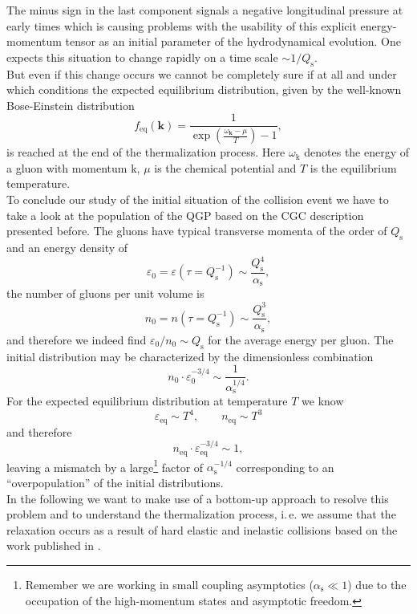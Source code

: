 The minus sign in the last component signals a negative longitudinal pressure at early times which is causing problems with the usability of this explicit energy-momentum tensor as an initial parameter of the hydrodynamical evolution. One expects this situation to change rapidly on a time scale $\sim 1/Q_{\mathrm{s}}$.\\
But even if this change occurs we cannot be completely sure if at all and under which conditions the expected equilibrium distribution, given by the well-known Bose-Einstein distribution 
\begin{equation}
	f_{\mathrm{eq}}(\mathbf{k}) = \frac{1}{\exp(\frac{\omega_{\mathbf{k}}-\mu}{T}) - 1}, \label{eqn:BEdist}
\end{equation}
is reached at the end of the thermalization process. Here $\omega_{\mathrm{k}}$ denotes the energy of a gluon with momentum $\mathrm{k}$, $\mu$ is the chemical potential and $T$ is the equilibrium temperature. \\

\noindent
To conclude our study of the initial situation of the collision event we have to take a look at the population of the QGP based on the CGC description presented before. The gluons have typical transverse momenta of the order of $Q_{\mathrm{s}}$ and an energy density of 
\begin{equation}
	\varepsilon_0 = \varepsilon(\tau=Q_{\mathrm{s}}^{-1})\sim \frac{Q_{\mathrm{s}}^{4}}{\alpha_{\mathrm{s}}},
\end{equation}
the number of gluons per unit volume is 
\begin{equation}
	n_0 = n(\tau=Q_{\mathrm{s}}^{-1})\sim \frac{Q_{\mathrm{s}}^{3}}{\alpha_{\mathrm{s}}},
\end{equation}
and therefore we indeed find $\varepsilon_0/n_0 \sim Q_{\mathrm{s}}$ for the average energy per gluon. The initial distribution may be characterized by the dimensionless combination
\begin{equation}
	n_0\cdot\varepsilon_0^{-3/4}\sim \frac{1}{\alpha_{\mathrm{s}}^{1/4}}.
\end{equation}
For the expected equilibrium distribution at temperature $T$ we know
\begin{equation}
	\varepsilon_{\mathrm{eq}} \sim T^{4},\qquad n_{\mathrm{eq}} \sim T^{3}
\end{equation}
and therefore 
\begin{equation}
	n_{\mathrm{eq}}\cdot\varepsilon_{\mathrm{eq}}^{-3/4}\sim 1,
\end{equation}
leaving a mismatch by a large\footnote{Remember we are working in small coupling asymptotics ($\alpha_{\mathrm{s}} \ll 1$) due to the occupation of the high-momentum states and asymptotic freedom.} factor of $\alpha_{\mathrm{s}}^{-1/4}$ corresponding to an \enquote{overpopulation} of the initial distributions.\\
\noindent
In the following we want to make use of a bottom-up approach to resolve this problem and to understand the thermalization process, i.\,e. we assume that the relaxation occurs as a result of hard elastic and inelastic collisions based on the work published in \cite{Blaizot2012, Blaizot2016}.
